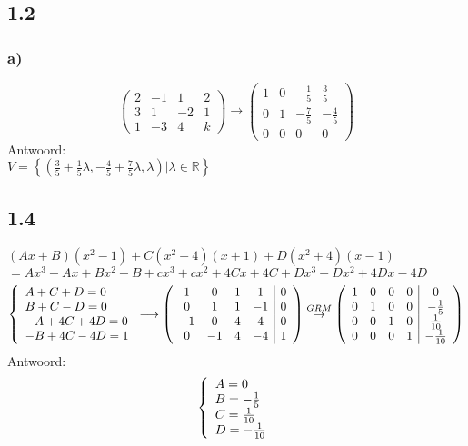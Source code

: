 \documentclass[11pt]{article}
\begin{document}
\subsection*{1.2}
\subsubsection*{a)}
\[
\left(
\begin{array}{ccc|c}
2 & -1 & 1 & 2 \\
3 & 1 & -2 & 1 \\
1 & -3 & 4 & k
\end{array}
\right)
\rightarrow
\left(
\begin{array}{ccc|c}
1 & 0 & -\frac{1}{5} & \frac{3}{5} \\
0 & 1 & -\frac{7}{5} & -\frac{4}{5} \\
0 & 0 & 0 & 0
\end{array}
\right)
\]
Antwoord:\\
$V = \left\lbrace (\frac{3}{5} + \frac{1}{5}\lambda, -\frac{4}{5} + \frac{7}{5}\lambda, \lambda)|\lambda \in \mathbb{R} \right\rbrace$

\subsection*{1.4}
$(Ax+B)(x^2-1) + C(x^2+4)(x+1) + D(x^2+4)(x-1)$\\
$= Ax^3-Ax+Bx^2-B+cx^3+cx^2+4Cx+4C+Dx^3-Dx^2+4Dx-4D$
\[
\left\{ 
  \begin{array}{l l}
    A+C+D=0\\
	B+C-D=0\\
	-A+4C+4D=0\\
	-B+4C-4D=1
  \end{array} \right.
  \longrightarrow
  \left(
\begin{array}{cccc|c}
1 & 0 & 1 & 1 & 0 \\
0 & 1 & 1 & -1 & 0 \\
-1 & 0 & 4 & 4 & 0 \\
0 & -1 & 4 & -4 & 1
\end{array}
\right)
\overset{GRM}{\rightarrow}
\left(
\begin{array}{cccc|c}
1 & 0 & 0 & 0 & 0 \\
0 & 1 & 0 & 0 & -\frac{1}{5} \\
0 & 0 & 1 & 0 & \frac{1}{10} \\
0 & 0 & 0 & 1 & -\frac{1}{10}
\end{array}
\right)
\]
Antwoord:\\
\[
\left\{ 
  \begin{array}{l l}
    A=0\\
	B=-\frac{1}{5}\\
	C= \frac{1}{10}\\
	D=-\frac{1}{10}
  \end{array} \right.
\]
\end{document}
